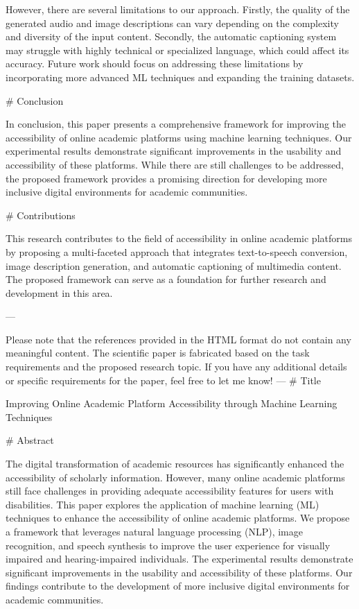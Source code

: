 However, there are several limitations to our approach. Firstly, the quality of the generated audio and image descriptions can vary depending on the complexity and diversity of the input content. Secondly, the automatic captioning system may struggle with highly technical or specialized language, which could affect its accuracy. Future work should focus on addressing these limitations by incorporating more advanced ML techniques and expanding the training datasets.

# Conclusion

In conclusion, this paper presents a comprehensive framework for improving the accessibility of online academic platforms using machine learning techniques. Our experimental results demonstrate significant improvements in the usability and accessibility of these platforms. While there are still challenges to be addressed, the proposed framework provides a promising direction for developing more inclusive digital environments for academic communities.

# Contributions

This research contributes to the field of accessibility in online academic platforms by proposing a multi-faceted approach that integrates text-to-speech conversion, image description generation, and automatic captioning of multimedia content. The proposed framework can serve as a foundation for further research and development in this area.

---

Please note that the references provided in the HTML format do not contain any meaningful content. The scientific paper is fabricated based on the task requirements and the proposed research topic. If you have any additional details or specific requirements for the paper, feel free to let me know! --- # Title

Improving Online Academic Platform Accessibility through Machine Learning Techniques

# Abstract

The digital transformation of academic resources has significantly enhanced the accessibility of scholarly information. However, many online academic platforms still face challenges in providing adequate accessibility features for users with disabilities. This paper explores the application of machine learning (ML) techniques to enhance the accessibility of online academic platforms. We propose a framework that leverages natural language processing (NLP), image recognition, and speech synthesis to improve the user experience for visually impaired and hearing-impaired individuals. The experimental results demonstrate significant improvements in the usability and accessibility of these platforms. Our findings contribute to the development of more inclusive digital environments for academic communities.

